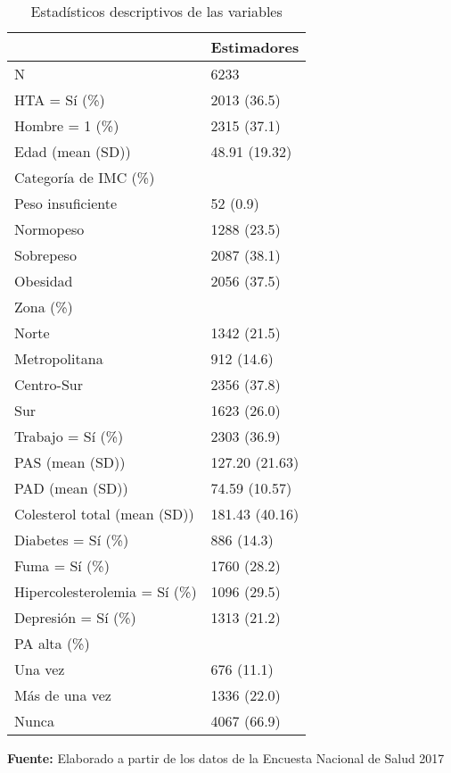 \documentclass{aa}
\begin{document}
\begin{table}{}
\caption{\small Estadísticos descriptivos de las variables}
    \centering
    \tiny
\begin{tabular*}{.9\linewidth}{@{\extracolsep{\fill}}ll}
\toprule
  & Estimadores \\
\midrule
N & 6233\\
HTA = Sí (\%) & 2013 (36.5)\\
Hombre = 1 (\%) & 2315 (37.1)\\
Edad (mean (SD)) & 48.91 (19.32)\\
\addlinespace
Categoría de IMC (\%) & \\
\-\hspace{5mm} \tiny Peso insuficiente & 52 (0.9)\\
\-\hspace{5mm} \tiny Normopeso & 1288 (23.5)\\
\-\hspace{5mm} \tiny Sobrepeso & 2087 (38.1)\\
\-\hspace{5mm} \tiny Obesidad & 2056 (37.5)\\
\addlinespace
Zona (\%) & \\
\-\hspace{5mm} \tiny Norte & 1342 (21.5)\\
\-\hspace{5mm} \tiny Metropolitana & 912 (14.6)\\
\-\hspace{5mm} \tiny Centro-Sur & 2356 (37.8)\\
\-\hspace{5mm} \tiny Sur & 1623 (26.0)\\
\addlinespace
Trabajo = Sí (\%) & 2303 (36.9)\\
PAS (mean (SD)) & 127.20 (21.63)\\
PAD (mean (SD)) & 74.59 (10.57)\\
Colesterol total (mean (SD)) & 181.43 (40.16)\\
Diabetes = Sí (\%) & 886 (14.3)\\
Fuma = Sí (\%) & 1760 (28.2)\\
Hipercolesterolemia = Sí (\%)&   1096 (29.5)\\
Depresión = Sí (\%) & 1313 (21.2)\\
\addlinespace
PA alta (\%) & \\
\-\hspace{5mm} \tiny Una vez & 676 (11.1)\\
\-\hspace{5mm} \tiny Más de una vez & 1336 (22.0)\\
\-\hspace{5mm} \tiny Nunca & 4067 (66.9)\\
\bottomrule
\end{tabular*}
    \vspace{1ex}
    
    {\raggedright \small \textbf{Fuente:} Elaborado a partir de los datos de la Encuesta Nacional de Salud 2017 \par}
\end{table}
\end{document}
